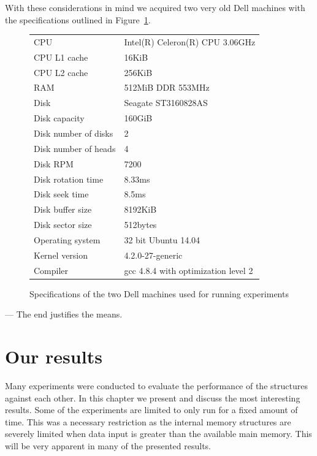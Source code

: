 \documentclass[twoside,11pt,openright]{report}
\begin{document}
With these considerations in mind we acquired two very old Dell machines with the specifications outlined in Figure~\ref{fig:pc_specs}.

\begin{figure}[h]
\centering
\begin{tabular}{ll}
CPU & Intel(R) Celeron(R) CPU 3.06GHz \\
CPU L1 cache & 16KiB \\
CPU L2 cache & 256KiB \\
RAM & 512MiB DDR 553MHz \\
Disk & Seagate ST3160828AS \\
Disk capacity & 160GiB \\
Disk number of disks & 2 \\
Disk number of heads & 4 \\
Disk RPM & 7200 \\
Disk rotation time & 8.33ms \\
Disk seek time & 8.5ms \\
Disk buffer size & 8192KiB \\
Disk sector size & 512bytes \\
Operating system & 32 bit Ubuntu 14.04 \\
Kernel version & 4.2.0-27-generic \\
Compiler & gcc 4.8.4 with optimization level 2
\end{tabular}
\caption{Specifications of the two Dell machines used for running experiments}
\label{fig:pc_specs}
\end{figure}

\begin{savequote}[0.4\textwidth]
--- The end justifies the means.
\end{savequote}
\chapter{Our results}
\label{chp:experimental_results}
Many experiments were conducted to evaluate the performance of the structures against each other. In this chapter we present and discuss the most interesting results. Some of the experiments are limited to only run for a fixed amount of time. This was a necessary restriction as the internal memory structures are severely limited when data input is greater than the available main memory. This will be very apparent in many of the presented results.
\end{document}

